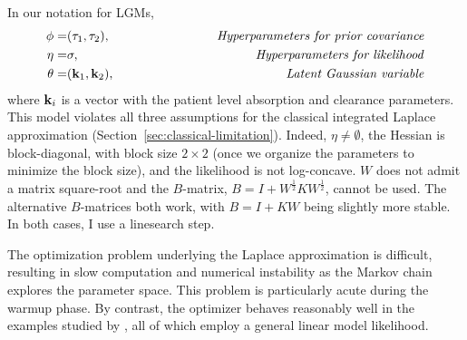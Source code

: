 \documentclass[stslayout, noinfoline]{imsart}
\theoremstyle{definition}
\begin{document}
In our notation for LGMs,
\begin{eqnarray*}
  \phi = & (\tau_1, \tau_2), & \hspace{1in} \text{\textit{Hyperparameters for prior covariance}} \\
  \eta = & \sigma, & \hspace{1in} \text{\textit{Hyperparameters for likelihood}} \\
  \theta = & ({\bf k}_1, {\bf k}_2), & \hspace{1in} \text{\textit{Latent Gaussian variable}}
\end{eqnarray*}
%
where ${\bf k}_i$ is a vector with the patient level absorption and clearance parameters.
%
This model violates all three assumptions for the classical integrated Laplace approximation (Section~\ref{sec:classical-limitation}).
Indeed, $\eta \neq \emptyset$, the Hessian is block-diagonal, with block size $2 \times 2$ (once we organize the parameters to minimize the block size),
and the likelihood is not log-concave.
$W$ does not admit a matrix square-root and the $B$-matrix, \mbox{$B = I + W^\frac{1}{2} K W^\frac{1}{2}$}, cannot be used.
The alternative $B$-matrices both work, with $B =  I + KW$ being slightly more stable.
In both cases, I use a linesearch step.

The optimization problem underlying the Laplace approximation is difficult,
resulting in slow computation and numerical instability as the Markov chain explores the parameter space.
This problem is particularly acute during the warmup phase.
%
%
By contrast, the optimizer behaves reasonably well in the examples studied by \citet{Margossian:2020-laplace}, all of which employ a general linear model likelihood.
\end{document}
